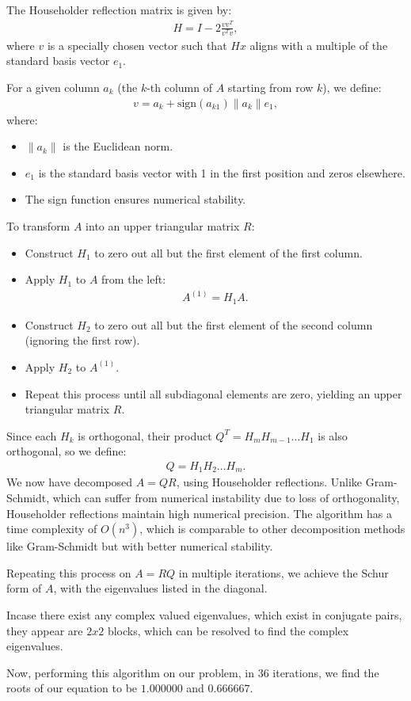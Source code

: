 \documentclass[journal]{IEEEtran}
\begin{document}
The Householder reflection matrix is given by:
\begin{align}
    H = I - 2 \frac{vv^T}{v^T v},
\end{align}
where $v$ is a specially chosen vector such that $Hx$ aligns with a multiple of the standard basis vector $e_1$.

For a given column $a_k$ (the $k$-th column of $A$ starting from row $k$), we define:
\begin{align}
    v = a_k + \text{sign}(a_{k1}) \|a_k\| e_1,
\end{align}
where:
\begin{itemize}
    \item $\|a_k\|$ is the Euclidean norm.
    \item $e_1$ is the standard basis vector with 1 in the first position and zeros elsewhere.
    \item The sign function ensures numerical stability.
\end{itemize}
To transform $A$ into an upper triangular matrix $R$:
\begin{itemize}
    \item Construct $H_1$ to zero out all but the first element of the first column.
    \item Apply $H_1$ to $A$ from the left:
    \begin{align}
        A^{(1)} = H_1 A.
    \end{align}
    \item Construct $H_2$ to zero out all but the first element of the second column (ignoring the first row).
    \item Apply $H_2$ to $A^{(1)}$.
    \item Repeat this process until all subdiagonal elements are zero, yielding an upper triangular matrix $R$.
\end{itemize}

Since each $H_k$ is orthogonal, their product $Q^T = H_m H_{m-1} \dots H_1$ is also orthogonal, so we define:
\begin{align}
    Q = H_1 H_2 \dots H_m.
\end{align}
We now have decomposed $A = QR$, using Householder reflections. Unlike Gram-Schmidt, which can suffer from numerical instability due to loss of orthogonality, Householder reflections maintain high numerical precision. The algorithm has a time complexity of $O(n^3)$, which is comparable to other decomposition methods like Gram-Schmidt but with better numerical stability.  

Repeating this process on $A=RQ$ in multiple iterations, we achieve the Schur form of $A$, with the eigenvalues listed in the diagonal. 

Incase there exist any complex valued eigenvalues, which exist in conjugate pairs, they appear are $2x2$ blocks, which can be resolved to find the complex eigenvalues. 

Now, performing this algorithm on our problem, in $36$ iterations, we find the roots of our equation to be $1.000000$ and $0.666667$. 
\end{document}

